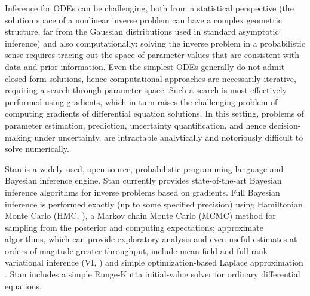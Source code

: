 \documentclass[11pt]{article}
\begin{document}
Inference for ODEs can be challenging, both from a statistical
perspective (the solution space of a nonlinear inverse problem can
have a complex geometric structure, far from the Gaussian
distributions used in standard asymptotic inference) and also
computationally: solving the inverse problem in a probabilistic sense
requires tracing out the space of parameter values that are consistent
with data and prior information.  Even the simplest ODEs generally do
not admit closed-form solutions, hence computational approaches are
necessarily iterative, requiring a search through parameter space.
Such a search is most effectively performed using gradients, which in
turn raises the challenging problem of computing gradients of
differential equation solutions. In this setting, problems of
parameter estimation, prediction, uncertainty quantification, and
hence decision-making under uncertainty, are intractable analytically
and notoriously difficult to solve numerically.

Stan \citep{carpenter-et-al:2016, stan-development-team:2016,
  mcelreath:2016} is a widely used, open-source, probabilistic
programming language and Bayesian inference engine.  Stan currently
provides state-of-the-art Bayesian inference algorithms for inverse
problems based on gradients.  Full Bayesian inference is performed
exactly (up to some specified precision) using Hamiltonian Monte Carlo
(HMC, \citep{neal:2011}), a Markov chain Monte Carlo (MCMC) method for
sampling from the posterior and computing expectations; approximate
algorithms, which can provide exploratory analysis and even useful
estimates at orders of magitude greater throughput, include mean-field
and full-rank variational inference (VI,
\citep{wainwright-jordan:2008}) and simple optimization-based Laplace
approximation \citep{gelman-et-al:2013}.  Stan includes a simple
Runge-Kutta initial-value solver for ordinary differential equations.
\end{document}
